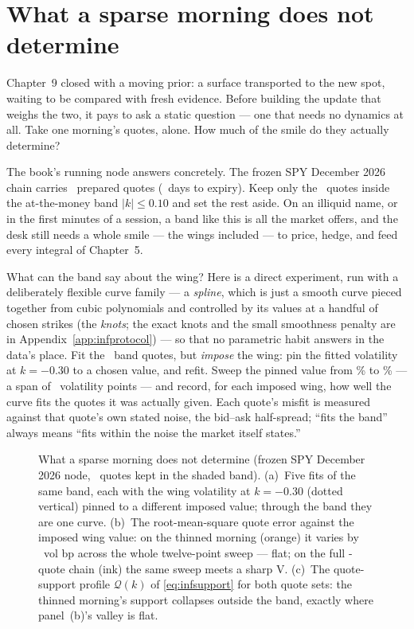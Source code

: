 \section{What a sparse morning does not determine}
\label{sec:infflat}

Chapter~9 closed with a moving prior: a surface transported to the
new spot, waiting to be compared with fresh evidence.  Before
building the update that weighs the two, it pays to ask a static
question --- one that needs no dynamics at all.  Take one morning's
quotes, alone.  How much of the smile do they actually determine?

The book's running node answers concretely.  The frozen SPY December
2026 chain carries \MacPriorFlatNFull\ prepared quotes
(\MacPriorFlatHeroDays\ days to expiry).  Keep only the
\MacPriorFlatNThin\ quotes inside the at-the-money band
$\lvert k\rvert\le0.10$ and set the rest aside.  On an illiquid
name, or in the first minutes of a session, a band like this is all
the market offers, and the desk still needs a whole smile --- the
wings included --- to price, hedge, and feed every integral of
Chapter~5.

What can the band say about the wing?  Here is a direct experiment,
run with a deliberately flexible curve family --- a \emph{spline},
which is just a smooth curve pieced together from cubic polynomials
and controlled by its values at a handful of chosen strikes (the
\emph{knots}; the exact knots and the small smoothness penalty are
in Appendix~\ref{app:infprotocol}) --- so that no parametric habit
answers in the data's place.  Fit the \MacPriorFlatNThin\ band quotes, but
\emph{impose} the wing: pin the fitted volatility at $k=-0.30$ to a
chosen value, and refit.  Sweep the pinned value from
\MacPriorFlatPinLoPct\% to \MacPriorFlatPinHiPct\% --- a span of
\MacPriorFlatPinSpanPts\ volatility points --- and record, for each
imposed wing, how well the curve fits the quotes it was actually
given.  Each quote's misfit is measured against that quote's own
stated noise, the bid--ask half-spread; ``fits the band'' always
means ``fits within the noise the market itself states.''

\begin{figure}[htbp]
\centering
{}
\caption{What a sparse morning does not determine (frozen SPY
December 2026 node, \MacPriorFlatNThin\ quotes kept in the shaded
band).  (a)~Five fits of the same band, each with the wing volatility
at $k=-0.30$ (dotted vertical) pinned to a different imposed value;
through the band they are one curve.  (b)~The root-mean-square quote
error against the imposed wing value: on the thinned morning
(orange) it varies by \MacPriorFlatValleyBp\ vol bp across the whole
twelve-point sweep --- flat; on the full \MacPriorFlatNFull-quote
chain (ink) the same sweep meets a sharp V.  (c)~The quote-support
profile $\mathcal{Q}(k)$ of \cref{eq:infsupport} for both quote sets:
the thinned morning's support collapses outside the band, exactly
where panel~(b)'s valley is flat.}
\label{fig:infflat}
\end{figure}

